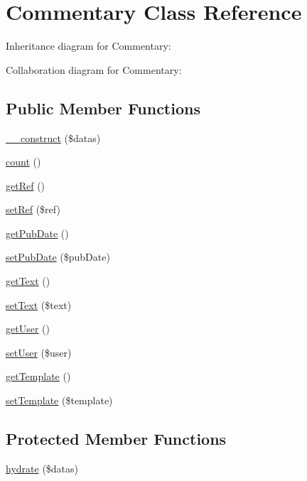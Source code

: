 \hypertarget{classCommentary}{}\section{Commentary Class Reference}
\label{classCommentary}


Inheritance diagram for Commentary\+:


Collaboration diagram for Commentary\+:
\subsection*{Public Member Functions}
\begin{DoxyCompactItemize}
\item 
\hyperlink{classCommentary_a3764ce9114bec19e6e3c8d18872dd45e}{\+\_\+\+\_\+construct} (\$datas)
\item 
\hyperlink{classCommentary_a8f8443760c23ed2ca2f3d44d73c83f7a}{count} ()
\item 
\hyperlink{classCommentary_a49fd28fb104f1eb823c7caf0dbfb1604}{get\+Ref} ()
\item 
\hyperlink{classCommentary_a280cadaa8d96b69b923f90a79dfff5c7}{set\+Ref} (\$ref)
\item 
\hyperlink{classCommentary_aadea30157d513b527365a472b029b9b8}{get\+Pub\+Date} ()
\item 
\hyperlink{classCommentary_aceef84b98f12d43f29b75dfb6288184e}{set\+Pub\+Date} (\$pub\+Date)
\item 
\hyperlink{classCommentary_aa54990942879c76342e6ef8a1d78929d}{get\+Text} ()
\item 
\hyperlink{classCommentary_ad1e070facd7727b7908d7f896d8398af}{set\+Text} (\$text)
\item 
\hyperlink{classCommentary_ab2dd4b2b29ff4d33adc6b8e87e3e0152}{get\+User} ()
\item 
\hyperlink{classCommentary_a9909c9ab320a332595cc7bdc2465b5e6}{set\+User} (\$user)
\item 
\hyperlink{classCommentary_a32de49a162042abf5565476fca4ab4ad}{get\+Template} ()
\item 
\hyperlink{classCommentary_aa62ba556f38d8bb3e971387e84f417c8}{set\+Template} (\$template)
\end{DoxyCompactItemize}
\subsection*{Protected Member Functions}
\begin{DoxyCompactItemize}
\item 
\hyperlink{classCommentary_a8409d077db22965fe9c75644aead31fa}{hydrate} (\$datas)
\end{DoxyCompactItemize}


